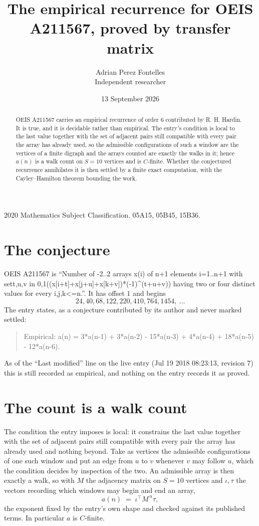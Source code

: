 \documentclass[11pt,a4paper]{article}
\title{The empirical recurrence for OEIS A211567, proved by transfer matrix}
\author{Adrian Perez Fontelles\\ \small Independent researcher}
\date{13 September 2026}
\theoremstyle{plain}
\theoremstyle{definition}
\begin{document}
\maketitle

\begin{abstract}
OEIS A211567 carries an empirical recurrence of order $6$ contributed by R. H. Hardin. It is
true, and it is decidable rather than empirical. The entry's condition is local to the last value together with the set of adjacent pairs still compatible with every pair the array has already used, so
the admissible configurations of such a window are the vertices of a finite digraph and the
arrays counted are exactly the walks in it; hence $a(n)$ is a walk count on $S=10$ vertices
and is $C$-finite. Whether the conjectured recurrence annihilates it is then settled by a
finite exact computation, with the Cayley--Hamilton theorem bounding the work.
\end{abstract}

\noindent\small 2020 Mathematics Subject Classification. 05A15, 05B45, 15B36.\normalsize

\section{The conjecture}

OEIS A211567 is ``Number of -2..2 arrays x(i) of n+1 elements i=1..n+1 with set{t,u,v in 0,1}((x[i+t]+x[j+u]+x[k+v])*(-1)\^{}(t+u+v)) having two or four distinct values for every i,j,k<=n.''. It has offset $1$ and begins
\[
24, 40, 68, 122, 220, 410, 764, 1454,\ \dots
\]
The entry states, as a conjecture contributed by its author and never marked settled:
\begin{quote}
Empirical: a(n) = 3*a(n-1) + 3*a(n-2) - 15*a(n-3) + 4*a(n-4) + 18*a(n-5) - 12*a(n-6).
\end{quote}
As of the ``Last modified'' line on the live entry (Jul 19 2018 08:23:13, revision 7) this is still
recorded as empirical, and nothing on the entry records it as proved.

\section{The count is a walk count}

The condition the entry imposes is local: it constrains the last value together with the set of adjacent pairs still compatible with every pair the array has already used and nothing beyond. Take as
vertices the admissible configurations of one such window and put an edge from $u$ to $v$
whenever $v$ may follow $u$, which the condition decides by inspection of the two. An
admissible array is then exactly a walk, so with $M$ the adjacency matrix on $S=10$ vertices
and $\iota,\tau$ the vectors recording which windows may begin and end an array,
\[
a(n)\;=\;\iota^{\!\top}M^{\,n}\tau ,
\]
the exponent fixed by the entry's own shape and checked against its published terms. In
particular $a$ is $C$-finite.
\end{document}
